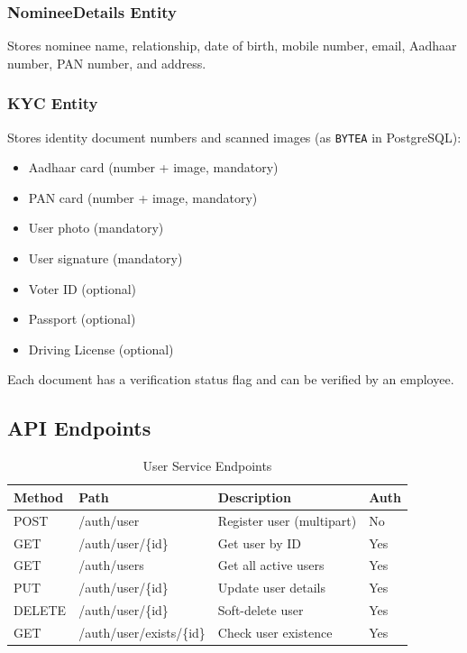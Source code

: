 \documentclass[12pt,a4paper]{report}
\begin{document}
\subsubsection{NomineeDetails Entity}
Stores nominee name, relationship, date of birth, mobile number, email, Aadhaar number, PAN number, and address.

\subsubsection{KYC Entity}
Stores identity document numbers and scanned images (as \texttt{BYTEA} in PostgreSQL):
\begin{itemize}
    \item Aadhaar card (number + image, mandatory)
    \item PAN card (number + image, mandatory)
    \item User photo (mandatory)
    \item User signature (mandatory)
    \item Voter ID (optional)
    \item Passport (optional)
    \item Driving License (optional)
\end{itemize}
Each document has a verification status flag and can be verified by an employee.

\subsection{API Endpoints}

\begin{table}[H]
\centering
\caption{User Service Endpoints}
\begin{tabularx}{\textwidth}{llXl}
\toprule
\textbf{Method} & \textbf{Path} & \textbf{Description} & \textbf{Auth} \\
\midrule
POST & /auth/user & Register user (multipart) & No \\
GET & /auth/user/\{id\} & Get user by ID & Yes \\
GET & /auth/users & Get all active users & Yes \\
PUT & /auth/user/\{id\} & Update user details & Yes \\
DELETE & /auth/user/\{id\} & Soft-delete user & Yes \\
GET & /auth/user/exists/\{id\} & Check user existence & Yes \\
\bottomrule
\end{tabularx}
\end{table}
\end{document}
